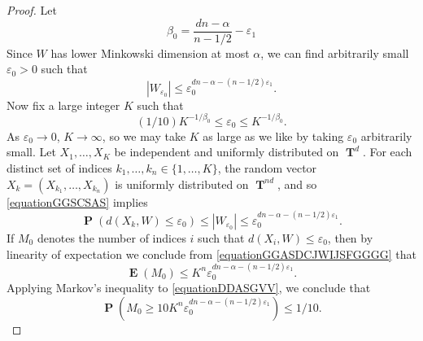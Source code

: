 \documentclass[12pt,reqno]{article}
\numberwithin{equation}{section}
\DeclareMathOperator{\TT}{\mathbf{T}}
\DeclareMathOperator{\EE}{\mathbf{E}}
\DeclareMathOperator{\PP}{\mathbf{P}}
\begin{document}
\begin{proof}
    Let
    \[ \beta_0 = \frac{dn - \alpha}{n - 1/2} - \varepsilon_1 \]
    Since $W$ has lower Minkowski dimension at most $\alpha$, we can find arbitrarily small $\varepsilon_0 > 0$ such that
    \begin{equation} \label{equationGGSCSAS}
        |W_{\varepsilon_0}| \leq \varepsilon_0^{dn - \alpha - (n-1/2) \varepsilon_1}.
    \end{equation}
    Now fix a large integer $K$ such that
    \[ (1/10)K^{-1/\beta_0} \leq \varepsilon_0 \leq K^{-1/\beta_0}. \]
    As $\varepsilon_0 \to 0$, $K \to \infty$, so we may take $K$ as large as we like by taking $\varepsilon_0$ arbitrarily small. Let $X_1, \dots, X_K$ be independent and uniformly distributed on $\TT^d$. For each distinct set of indices $k_1, \dots, k_n \in \{ 1, \dots, K \}$, the random vector $X_k = (X_{k_1}, \dots, X_{k_n})$ is uniformly distributed on $\TT^{nd}$, and so \eqref{equationGGSCSAS} implies
    \begin{equation} \label{equationGGASDCJWIJSFGGGG}
        \PP(d(X_k,W) \leq \varepsilon_0) \leq |W_{\varepsilon_0}| \leq \varepsilon_0^{dn - \alpha - (n-1/2) \varepsilon_1}.
    \end{equation}
    If $M_0$ denotes the number of indices $i$ such that $d(X_i,W) \leq \varepsilon_0$, then by linearity of expectation we conclude from \eqref{equationGGASDCJWIJSFGGGG} that
    \begin{equation} \label{equationDDASGVV}
        \EE(M_0) \leq K^n \varepsilon_0^{dn - \alpha - (n-1/2) \varepsilon_1}.
    \end{equation}
    Applying Markov's inequality to \eqref{equationDDASGVV}, we conclude that
    \begin{equation} \label{equationFGGGSC}
        \PP(M_0 \geq 10 K^n \varepsilon_0^{dn - \alpha - (n-1/2) \varepsilon_1}) \leq 1/10.
    \end{equation}

\end{proof}
\end{document}
